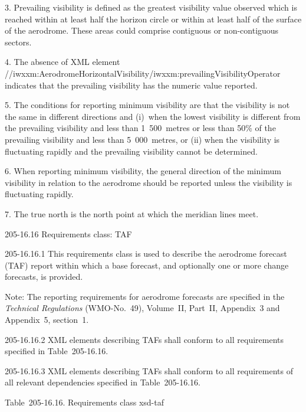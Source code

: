 3. Prevailing visibility is defined as the greatest visibility value observed which is reached within at least half the horizon circle or within at least half of the surface of the aerodrome. These areas could comprise contiguous or non-contiguous sectors.

4. The absence of XML element //iwxxm:AerodromeHorizontalVisibility/iwxxm:prevailingVisibilityOperator indicates that the prevailing visibility has the numeric value reported.

5. The conditions for reporting minimum visibility are that the visibility is not the same in different directions and (i)~when the lowest visibility is different from the prevailing visibility and less than 1~500~metres or less than 50\% of the prevailing visibility and less than 5~000~metres, or (ii) when the visibility is fluctuating rapidly and the prevailing visibility cannot be determined.

6. When reporting minimum visibility, the general direction of the minimum visibility in relation to the aerodrome should be reported unless the visibility is fluctuating rapidly.

7. The true north is the north point at which the meridian lines meet.

205-16.16 Requirements class: TAF

205-16.16.1 This requirements class is used to describe the aerodrome forecast (TAF) report within which a base forecast, and optionally one or more change forecasts, is provided.

Note: The reporting requirements for aerodrome forecasts are specified in the \emph{Technical Regulations} (WMO-No.~49), Volume~II, Part~II, Appendix~3 and Appendix~5, section~1.

205-16.16.2 XML elements describing TAFs shall conform to all requirements specified in Table~205-16.16.

205-16.16.3 XML elements describing TAFs shall conform to all requirements of all relevant dependencies specified in Table~205-16.16.

Table~205-16.16. Requirements class xsd-taf


